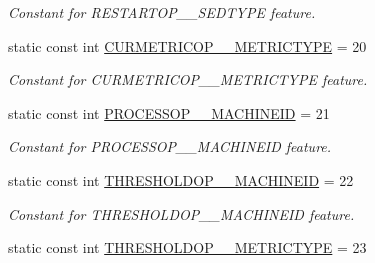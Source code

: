 \begin{DoxyCompactItemize}
\begin{DoxyCompactList}\small\item\em Constant for RESTARTOP\_\-\_\-SEDTYPE feature. \item\end{DoxyCompactList}\item 
\hypertarget{classIMS__Data_1_1IMS__DataPackage_af5f4f04e921445a350ab9dcb9028ec1d}{
static const int \hyperlink{classIMS__Data_1_1IMS__DataPackage_af5f4f04e921445a350ab9dcb9028ec1d}{CURMETRICOP\_\-\_\-METRICTYPE} = 20}
\label{classIMS__Data_1_1IMS__DataPackage_af5f4f04e921445a350ab9dcb9028ec1d}

\begin{DoxyCompactList}\small\item\em Constant for CURMETRICOP\_\-\_\-METRICTYPE feature. \item\end{DoxyCompactList}\item 
\hypertarget{classIMS__Data_1_1IMS__DataPackage_a1036faeee602f95d9ffb9f4f53af670b}{
static const int \hyperlink{classIMS__Data_1_1IMS__DataPackage_a1036faeee602f95d9ffb9f4f53af670b}{PROCESSOP\_\-\_\-MACHINEID} = 21}
\label{classIMS__Data_1_1IMS__DataPackage_a1036faeee602f95d9ffb9f4f53af670b}

\begin{DoxyCompactList}\small\item\em Constant for PROCESSOP\_\-\_\-MACHINEID feature. \item\end{DoxyCompactList}\item 
\hypertarget{classIMS__Data_1_1IMS__DataPackage_a80afdd17cffe713c93973436e7f6b9d8}{
static const int \hyperlink{classIMS__Data_1_1IMS__DataPackage_a80afdd17cffe713c93973436e7f6b9d8}{THRESHOLDOP\_\-\_\-MACHINEID} = 22}
\label{classIMS__Data_1_1IMS__DataPackage_a80afdd17cffe713c93973436e7f6b9d8}

\begin{DoxyCompactList}\small\item\em Constant for THRESHOLDOP\_\-\_\-MACHINEID feature. \item\end{DoxyCompactList}\item 
\hypertarget{classIMS__Data_1_1IMS__DataPackage_a4e85bfc9389a4862859acfa57553581d}{
static const int \hyperlink{classIMS__Data_1_1IMS__DataPackage_a4e85bfc9389a4862859acfa57553581d}{THRESHOLDOP\_\-\_\-METRICTYPE} = 23}
\label{classIMS__Data_1_1IMS__DataPackage_a4e85bfc9389a4862859acfa57553581d}


\end{DoxyCompactItemize}

